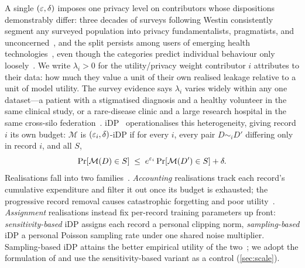 A single $(\varepsilon, \delta)$ imposes one privacy level on contributors
whose dispositions demonstrably differ: three decades of surveys
following Westin consistently segment any surveyed population into
privacy fundamentalists, pragmatists, and
unconcerned~\cite{kumaraguru2005privacy}, and the split persists
among users of emerging health
technologies~\cite{schairer2019disposition}, even though the
categories predict individual behaviour only
loosely~\cite{woodruff2014would}. We write $\lambda_i > 0$ for the
utility/privacy weight contributor $i$ attributes to their data: how
much they value a unit of their own realised leakage relative to a
unit of model utility. The survey evidence says $\lambda_i$ varies
widely within any one dataset---a patient with a stigmatised
diagnosis and a healthy volunteer in the same clinical study, or a
rare-disease clinic and a large research hospital in the same
cross-silo federation~\cite{kairouz2021advances,
mcmahan2017communication, liu2024crosssilo}.
\ac{iDP}~\cite{jorgensen2015conservative} operationalises this
heterogeneity, giving record $i$ its own budget: $\mathcal{M}$ is
$(\varepsilon_i, \delta)$-iDP if for every $i$,
every pair $D \sim_i D'$ differing only in record $i$, and all $S$,
\begin{equation}
\Pr[\mathcal{M}(D) \in S] \;\leq\; e^{\varepsilon_i} \Pr[\mathcal{M}(D') \in S] +
\delta .
\label{eq:idp}
\end{equation}
Realisations fall into two families~\cite{feldman2021individual,
boenisch2023have}. \emph{Accounting} realisations track each record's
cumulative expenditure and filter it out once its budget is
exhausted; the progressive record removal causes catastrophic
forgetting and poor utility~\cite{feldman2021individual,
boenisch2023have}. \emph{Assignment} realisations instead fix
per-record training parameters up front: \emph{sensitivity-based} \ac{iDP}
assigns each record a personal clipping norm, \emph{sampling-based}
\ac{iDP} a personal Poisson sampling rate under one shared noise
multiplier. Sampling-based \ac{iDP} attains the better empirical utility
of the two~\cite{boenisch2023have, kaiser2026your}; we adopt the
formulation of \citet{boenisch2023have} and use the sensitivity-based
variant as a control (\cref{sec:scale}).

